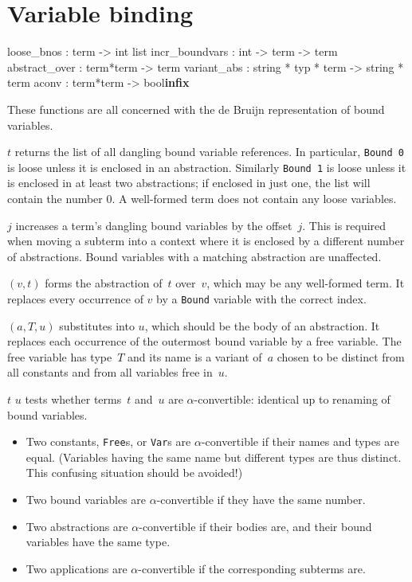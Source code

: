 \section{Variable binding}
\begin{ttbox}
loose_bnos     : term -> int list
incr_boundvars : int -> term -> term
abstract_over  : term*term -> term
variant_abs    : string * typ * term -> string * term
aconv          : term*term -> bool\hfill{\bf infix}
\end{ttbox}
These functions are all concerned with the de Bruijn representation of
bound variables.
\begin{ttdescription}
\item[\ttindexbold{loose_bnos} $t$] 
  returns the list of all dangling bound variable references.  In
  particular, {\tt Bound~0} is loose unless it is enclosed in an
  abstraction.  Similarly {\tt Bound~1} is loose unless it is enclosed in
  at least two abstractions; if enclosed in just one, the list will contain
  the number 0.  A well-formed term does not contain any loose variables.

\item[\ttindexbold{incr_boundvars} $j$] 
  increases a term's dangling bound variables by the offset~$j$.  This is
  required when moving a subterm into a context where it is enclosed by a
  different number of abstractions.  Bound variables with a matching
  abstraction are unaffected.

\item[\ttindexbold{abstract_over} $(v,t)$] 
  forms the abstraction of~$t$ over~$v$, which may be any well-formed term.
  It replaces every occurrence of \(v\) by a {\tt Bound} variable with the
  correct index.

\item[\ttindexbold{variant_abs} $(a,T,u)$] 
  substitutes into $u$, which should be the body of an abstraction.
  It replaces each occurrence of the outermost bound variable by a free
  variable.  The free variable has type~$T$ and its name is a variant
  of~$a$ chosen to be distinct from all constants and from all variables
  free in~$u$.

\item[$t$ \ttindexbold{aconv} $u$] 
  tests whether terms~$t$ and~$u$ are \(\alpha\)-convertible: identical up
  to renaming of bound variables.
\begin{itemize}
  \item
    Two constants, {\tt Free}s, or {\tt Var}s are \(\alpha\)-convertible
    if their names and types are equal.
    (Variables having the same name but different types are thus distinct.
    This confusing situation should be avoided!)
  \item
    Two bound variables are \(\alpha\)-convertible
    if they have the same number.
  \item
    Two abstractions are \(\alpha\)-convertible
    if their bodies are, and their bound variables have the same type.
  \item
    Two applications are \(\alpha\)-convertible
    if the corresponding subterms are.
\end{itemize}

\end{ttdescription}

